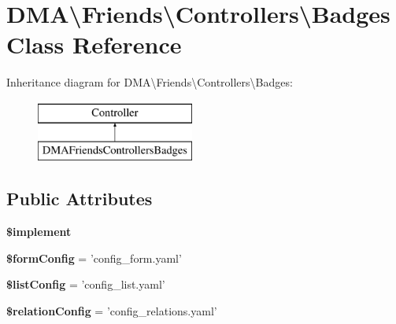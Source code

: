 \hypertarget{classDMA_1_1Friends_1_1Controllers_1_1Badges}{\section{D\-M\-A\textbackslash{}Friends\textbackslash{}Controllers\textbackslash{}Badges Class Reference}
\label{classDMA_1_1Friends_1_1Controllers_1_1Badges}
}
Inheritance diagram for D\-M\-A\textbackslash{}Friends\textbackslash{}Controllers\textbackslash{}Badges\-:\begin{figure}[H]
\begin{center}
\leavevmode
\includegraphics[height=2.000000cm]{d2/d27/classDMA_1_1Friends_1_1Controllers_1_1Badges}
\end{center}
\end{figure}
\subsection*{Public Attributes}
\begin{DoxyCompactItemize}
\item 
{\bfseries \$implement}
\item 
\hypertarget{classDMA_1_1Friends_1_1Controllers_1_1Badges_acc1326493cec81e89163a9f917990fc5}{{\bfseries \$form\-Config} = 'config\-\_\-form.\-yaml'}\label{classDMA_1_1Friends_1_1Controllers_1_1Badges_acc1326493cec81e89163a9f917990fc5}

\item 
\hypertarget{classDMA_1_1Friends_1_1Controllers_1_1Badges_a334b46e1ea9b57d53e297c4a5f93e045}{{\bfseries \$list\-Config} = 'config\-\_\-list.\-yaml'}\label{classDMA_1_1Friends_1_1Controllers_1_1Badges_a334b46e1ea9b57d53e297c4a5f93e045}

\item 
\hypertarget{classDMA_1_1Friends_1_1Controllers_1_1Badges_a70621d9f81b7f23a330e7f08dbdb7ce9}{{\bfseries \$relation\-Config} = 'config\-\_\-relations.\-yaml'}\label{classDMA_1_1Friends_1_1Controllers_1_1Badges_a70621d9f81b7f23a330e7f08dbdb7ce9}

\end{DoxyCompactItemize}


